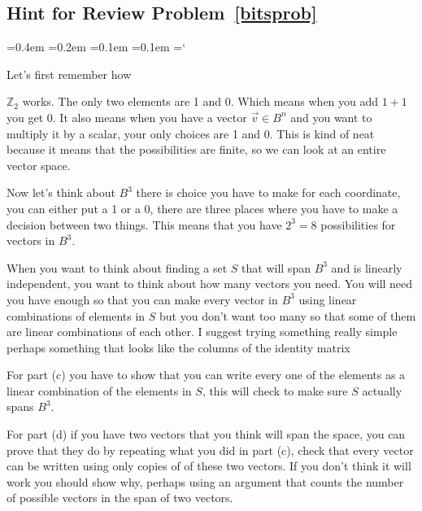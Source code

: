 
\subsection*{Hint for Review Problem~\ref{bitsprob}}

{\ttfamily
{}\font=0.4em
\font=0.2em
\font=0.1em
\font=0.1em
\hyphenchar\font=`\-


\hypertarget{linear_independence_hint}{Let's first remember how} $\mathbb{Z}_2$ works. The only two elements are 1 and 0. Which means when you add $1+1$ you get $0$. It also means when you have a vector $\vec{v} \in B^n$ and you want to multiply it by a scalar, your only choices are 1 and 0. This is kind of neat because it means that the possibilities are finite, so we can look at an entire vector space.

Now let's think about $B^3$ there is choice you have to make for each coordinate, you can either put a 1 or a 0, there are three places where you have to make a decision between two things. This means that you have $2^3= 8$ possibilities for vectors in $B^3$.

When you want to think about finding a set $S$ that will span $B^3$ and is linearly independent, you want to think about how many vectors you need. You will need you have enough so that you can make every vector in $B^3$ using linear combinations of elements in $S$ but you don't want too many so that some of them are linear combinations of each other. I suggest trying something really simple perhaps something that looks like the columns of the identity matrix

For part (c) you have to show that you can write every one of the elements as a linear combination of the elements in $S$, this will check to make sure $S$ actually spans $B^3$. 

For part (d) if you have two vectors that you think will span the space, you can prove that they do by repeating what you did in part (c), check that every vector can be written using only copies of of these two vectors. If you don't think it will work you should show why, perhaps using an argument that counts the number of possible vectors in the span of two vectors.




} %

